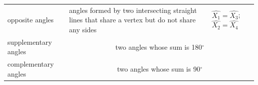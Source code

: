 {\begin{tabular}[t]{|l|l|l|}
    
        opposite angles &
    
    
        angles formed by two intersecting straight lines that share a vertex but do not share any sides &
    
    
        
                  \begin{math}\hat{{X}_{1}}=\hat{{X}_{3}}\end{math};
                  \begin{math}\hat{{X}_{2}}=\hat{{X}_{4}}\end{math}
     \tabularnewline\cline{1-1}\cline{2-2}\cline{3-3}
    
    
        supplementary angles &
    \multicolumn{2}{c|}{two angles whose sum is 180\begin{math}{}^{\circ }\end{math}}
     \tabularnewline\cline{1-1}\cline{2-2}\cline{3-3}
    
    
        complementary angles &
    \multicolumn{2}{c|}{two angles whose sum is 90\begin{math}{}^{\circ }\end{math}}
     \tabularnewline\cline{1-1}\cline{2-2}\cline{3-3}
    \end{tabular}} %
      \addtocounter{footnote}{-0}
      
